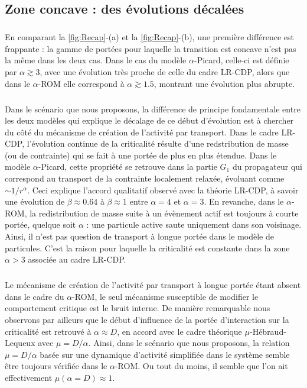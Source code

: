 \subsection{Zone concave : des évolutions décalées}

\subparagraph{}En comparant la \autoref{fig:Recap}-(a) et la \autoref{fig:Recap}-(b), une première différence est frappante : la gamme de portées pour laquelle la transition est concave n'est pas la même dans les deux cas. Dans le cas du modèle $\alpha$-Picard, celle-ci est définie par $\alpha \gtrsim 3$, avec une évolution très proche de celle du cadre LR-CDP, alors que dans le $\alpha$-ROM elle correspond à $\alpha \gtrsim 1.5$, montrant une évolution plus abrupte.

\subparagraph{}Dans le scénario que nous proposons, la différence de principe fondamentale entre les deux modèles qui explique le décalage de ce début d'évolution est à chercher du côté du mécanisme de création de l'activité par transport. Dans le cadre LR-CDP, l'évolution continue de la criticalité résulte d'une redstribution de masse (ou de contrainte) qui se fait à une portée de plus en plus étendue. Dans le modèle $\alpha$-Picard, cette propriété se retrouve dans la partie $G_1$ du propagateur qui correspond au transport de la contrainte localement relaxée, évoluant comme $\sim 1/r^\alpha$. Ceci explique l'accord qualitatif observé avec la théorie LR-CDP, à savoir une évolution de $\beta \approx 0.64$ à $\beta \approx 1$ entre $\alpha = 4$ et $\alpha = 3$. En revanche, dans le $\alpha$-ROM, la redistribution de masse suite à un évènement actif est toujours à courte portée, quelque soit $\alpha$ : une particule active saute uniquement dans son voisinage. Ainsi, il n'est pas question de transport à longue portée dans le modèle de particules. C'est la raison pour laquelle la criticalité est constante dans la zone $\alpha > 3$ associée au cadre LR-CDP.

\subparagraph{}Le mécanisme de création de l'activité par transport à longue portée étant absent dans le cadre du $\alpha$-ROM, le seul mécanisme susceptible de modifier le comportement critique est le bruit interne. De manière remarquable nous observons par ailleurs que le début d'influence de la portée d'interaction sur la criticalité est retrouvé à $\alpha \approx D$, en accord avec le cadre théorique $\mu$-Hébraud-Lequeux avec $\mu = D/\alpha$. Ainsi, dans le scénario que nous proposons, la relation $\mu = D/\alpha$ basée sur une dynamique d'activité simplifiée dans le système semble être toujours vérifiée dans le $\alpha$-ROM. Ou tout du moins, il semble que l'on ait effectivement $\mu(\alpha = D) \approx 1$.

